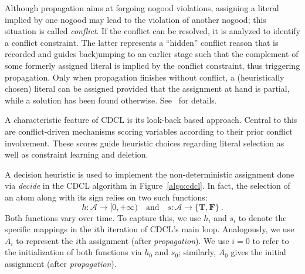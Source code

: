 \documentclass[letterpaper]{article}
\newcommand{\true}{\ensuremath{\boldsymbol{T}}}
\newcommand{\false}{\ensuremath{\boldsymbol{F}}}
\newcommand{\ass}{\ensuremath{A}}
\begin{document}
Although propagation aims at forgoing nogood violations,
assigning a literal implied by one nogood may lead to the violation of another nogood;
this situation is called \emph{conflict}.
If the conflict can be resolved, %
it is analyzed to identify a conflict constraint.
The latter represents a ``hidden'' conflict reason that is recorded and
guides backjumping to an earlier stage such that
the complement of some formerly assigned literal is implied by the conflict constraint,
thus triggering propagation.
Only when propagation finishes without conflict,
a (heuristically chosen) literal can be assigned %
provided that the assignment at hand is partial,
while a {solution} %
has been found otherwise.
%
See~\cite{SATHandbook} for details.

A characteristic feature of CDCL is its look-back based approach.
Central to this are conflict-driven mechanisms scoring variables according to their prior conflict involvement.
These scores guide heuristic choices regarding literal selection as well as constraint learning and deletion.

A decision heuristic is used to implement the non-deterministic assignment done via
\emph{decide} in the CDCL algorithm in Figure~\ref{algo:cdcl}.
In fact,
the selection of an atom along with its sign relies on two such functions:
\[
h: \mathcal{A}\to[0,+\infty)
\quad\text{and}\quad
s: \mathcal{A}\to\{\true,\false\}
\ .
\]
Both functions vary over time.
To capture this, we use $h_i$ and $s_i$ to denote the specific mappings in the $i$th iteration of CDCL's main loop.
Analogously, we use $\ass_i$ to represent the $i$th assignment (after \textit{propagation}).
We use $i=0$ to refer to the initialization of both functions via $h_0$ and $s_0$;
similarly, $A_0$ gives the initial assignment (after \textit{propagation}).
\end{document}
